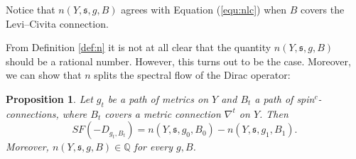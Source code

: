 \documentclass{amsart}
\newtheorem{proposition}[theorem]{Proposition}
\theoremstyle{definition}
\theoremstyle{remark}
\numberwithin{equation}{section}
\begin{document}
Notice that $n(Y , \mathfrak{s} , g , B)$ agrees with Equation (\ref{equ:nlc}) when $B$ covers the Levi--Civita connection.

From Definition \ref{def:n} it is not at all clear that the quantity $n(Y , \mathfrak{s}  ,g , B)$ should be a rational number. However, this turns out to be the case. Moreover, we can show that $n$ splits the spectral flow of the Dirac operator:

\begin{proposition}
Let $g_t$ be a path of metrics on $Y$ and $B_t$ a path of spin$^c$-connections, where $B_t$ covers a metric connection $\nabla^t$ on $Y$. Then
\[
SF(-D_{g_t,B_t}) = n(Y , \mathfrak{s} , g_0 , B_0) - n(Y , \mathfrak{s} , g_1  ,B_1).
\]
Moreover, $n(Y , \mathfrak{s} , g , B) \in \mathbb{Q}$ for every $g,B$.
\end{proposition}
\end{document}
